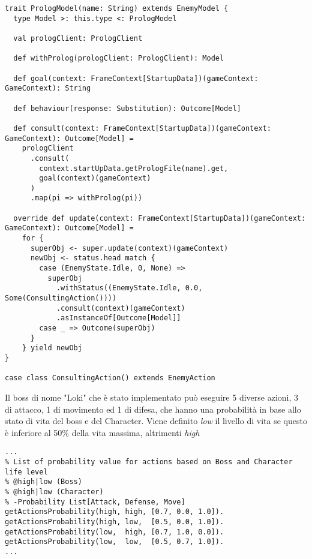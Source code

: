 \begin{lstlisting}[basicstyle=\tiny]
trait PrologModel(name: String) extends EnemyModel {
  type Model >: this.type <: PrologModel

  val prologClient: PrologClient

  def withProlog(prologClient: PrologClient): Model

  def goal(context: FrameContext[StartupData])(gameContext: GameContext): String

  def behaviour(response: Substitution): Outcome[Model]

  def consult(context: FrameContext[StartupData])(gameContext: GameContext): Outcome[Model] =
    prologClient
      .consult(
        context.startUpData.getPrologFile(name).get,
        goal(context)(gameContext)
      )
      .map(pi => withProlog(pi))

  override def update(context: FrameContext[StartupData])(gameContext: GameContext): Outcome[Model] =
    for {
      superObj <- super.update(context)(gameContext)
      newObj <- status.head match {
        case (EnemyState.Idle, 0, None) =>
          superObj
            .withStatus((EnemyState.Idle, 0.0, Some(ConsultingAction())))
            .consult(context)(gameContext)
            .asInstanceOf[Outcome[Model]]
        case _ => Outcome(superObj)
      }
    } yield newObj
}

case class ConsultingAction() extends EnemyAction
\end{lstlisting}

Il boss di nome "Loki" che è stato implementato può eseguire 5 diverse azioni, 3 di attacco, 1 di movimento ed 1 di difesa,
che hanno una probabilità in base allo stato di vita del boss e del Character. 
Viene definito \textit{low} il livello di vita se questo è inferiore al 50\% della vita massima, altrimenti \textit{high}

\begin{lstlisting}[basicstyle=\tiny]
% estratto del file prolog "assets/prolog/loki.pl"
... 
% List of probability value for actions based on Boss and Character life level
% @high|low (Boss)
% @high|low (Character)
% -Probability List[Attack, Defense, Move]
getActionsProbability(high, high, [0.7, 0.0, 1.0]).
getActionsProbability(high, low,  [0.5, 0.0, 1.0]).
getActionsProbability(low,  high, [0.7, 1.0, 0.0]).
getActionsProbability(low,  low,  [0.5, 0.7, 1.0]).
...
\end{lstlisting}

